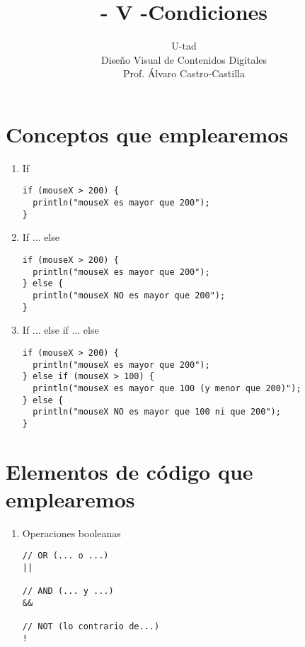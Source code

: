 \documentclass[a4paper,oneside]{article}
\title{- V -\linebreak Condiciones}
\author{U-tad\\ Diseño Visual de Contenidos Digitales\\ Prof. Álvaro Castro-Castilla}
\date{}
\begin{document}
\maketitle


\section{Conceptos que emplearemos}
\begin{enumerate}
  \item If

    \begin{verbatim}
if (mouseX > 200) {
  println("mouseX es mayor que 200");
}
    \end{verbatim}

  \item If ... else

    \begin{verbatim}
if (mouseX > 200) {
  println("mouseX es mayor que 200");
} else {
  println("mouseX NO es mayor que 200");
}
    \end{verbatim}

  \item If ... else if ... else

    \begin{verbatim}
if (mouseX > 200) {
  println("mouseX es mayor que 200");
} else if (mouseX > 100) {
  println("mouseX es mayor que 100 (y menor que 200)");
} else {
  println("mouseX NO es mayor que 100 ni que 200");
}
    \end{verbatim}
      
\end{enumerate}


\section{Elementos de código que emplearemos}
\begin{enumerate}
  \item Operaciones booleanas

    \begin{verbatim}
// OR (... o ...)
||

// AND (... y ...)
&&

// NOT (lo contrario de...)
!
    \end{verbatim}
\end{enumerate}
\end{document}
